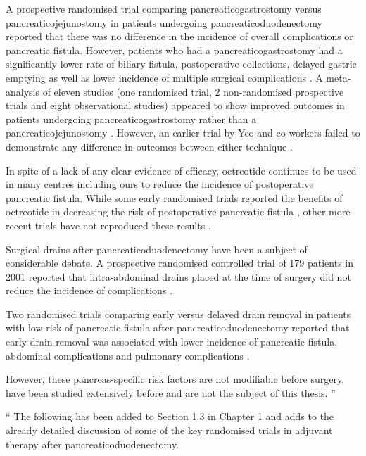 	A prospective randomised trial comparing pancreaticogastrostomy versus pancreaticojejunostomy in patients undergoing pancreaticoduodenectomy reported that there was no difference in the incidence of overall complications or pancreatic fistula. 
	However, patients who had a pancreaticogastrostomy had a significantly lower rate of biliary fistula, postoperative collections, delayed gastric emptying as well as lower incidence of multiple surgical complications \parencite{bassi_reconstruction_2005}. 
	A meta-analysis of eleven studies (one randomised trial, 2 non-randomised prospective trials and eight observational studies) appeared to show improved outcomes in patients undergoing pancreaticogastrostomy rather than a pancreaticojejunostomy \parencite{mckay_meta-analysis_2006}. 
	However, an earlier trial by Yeo and co-workers failed to demonstrate any difference in outcomes between either technique \parencite{yeo_prospective_1995}.
	
	In spite of a lack of any clear evidence of efficacy, octreotide continues to be used in many centres including ours to reduce the incidence of postoperative pancreatic fistula. 
	While some early randomised trials reported the benefits of octreotide in decreasing the risk of postoperative pancreatic fistula \parencite{montorsi_efficacy_1995,nakatsuka_octreotide_2000}, other more recent trials have not reproduced these results \parencite{lowy_prospective_1997, yeo_does_2000, kollmar_prophylactic_2008}. 
	
	Surgical drains after pancreaticoduodenectomy have been a subject of considerable debate. 
	A prospective randomised controlled trial of 179 patients in 2001 reported that intra-abdominal drains placed at the time of surgery did not reduce the incidence of complications \parencite{conlon_prospective_2001}.
	
	Two randomised trials comparing early versus delayed drain removal in patients with low risk of pancreatic fistula after pancreaticoduodenectomy reported that early drain removal was associated with lower incidence of pancreatic fistula, abdominal complications and pulmonary complications \parencite{kawai_early_2006,bassi_early_2010}. 
	
	However, these pancreas-specific risk factors are not modifiable before surgery, have been studied extensively before and are not the subject of this thesis.
	\textquotedblright
	
	\textquotedblleft		
	The following has been added to Section 1.3 in Chapter 1 and adds to the already detailed discussion of some of the key randomised trials in adjuvant therapy after pancreaticoduodenectomy.
	
